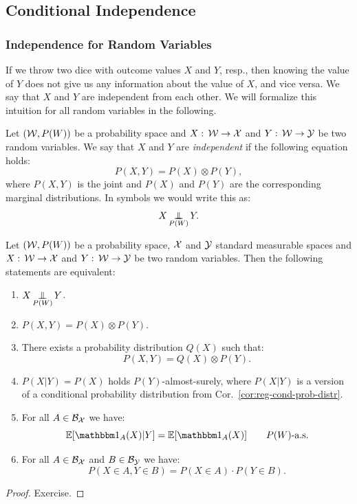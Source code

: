\subsection{Conditional Independence}


\subsubsection{Independence for Random Variables}

\begin{Motivation}
    If we throw two dice with outcome values $X$ and $Y$, resp., then knowing the value of $Y$ does not give us any information about the value of $X$, and vice versa. We say that $X$ and $Y$ are independent from each other. We will formalize this intuition for all random variables in the following.
\end{Motivation}

\begin{Def}
    \label{def:indep-rv}
    Let $(\mathcal{W},P(W))$ be a probability space and $X:\, \mathcal{W} \to \mathcal{X}$ and $Y:\, \mathcal{W} \to \mathcal{Y}$ be two random variables.
    We say that $X$ and $Y$ are \emph{independent} if the following equation holds:
    \[
        P(X,Y) = P(X) \otimes P(Y),
    \]
    where $P(X,Y)$ is the joint and $P(X)$ and $P(Y)$ are the corresponding marginal distributions.
    In symbols we would write this as:
    \[ X \operatorname*{\perp\mkern-11mu\perp}_{P(W)} Y.\]
\end{Def}

\begin{Lem}
    \label{lem:indep-rv}
     Let $(\mathcal{W},P(W))$ be a probability space, $\mathcal{X}$ and $\mathcal{Y}$ standard measurable spaces 
     and $X:\, \mathcal{W} \to \mathcal{X}$ and $Y:\, \mathcal{W} \to \mathcal{Y}$ be two random variables.
     Then the following statements are equivalent:
     \begin{enumerate}
         \item $\displaystyle X \operatorname*{\perp\mkern-11mu\perp}_{P(W)} Y$.
         \item $P(X,Y) = P(X) \otimes P(Y)$.
         \item There exists a probability distribution $Q(X)$ such that:
             \[ P(X,Y) = Q(X) \otimes P(Y).\]
         \item $P(X|Y) = P(X)$ holds $P(Y)$-almost-surely, 
             where $P(X|Y)$ is a version of a conditional probability distribution from Cor.\ \ref{cor:reg-cond-prob-distr}. 
         \item For all $A \in \mathcal{B}_{\mathcal{X}}$ we have:
             \[ \E[\I_A(X)|Y] = \E[\I_A(X)] \qquad P(W)\text{-a.s.}\]
         \item For all $A \in \mathcal{B}_{\mathcal{X}}$ and $B \in \mathcal{B}_{\mathcal{Y}}$ we have:
             \[ P(X \in A, Y \in B) = P(X \in A) \cdot P(Y \in B). \]
     \end{enumerate}
     \begin{proof}
         Exercise.
     \end{proof}
\end{Lem}

